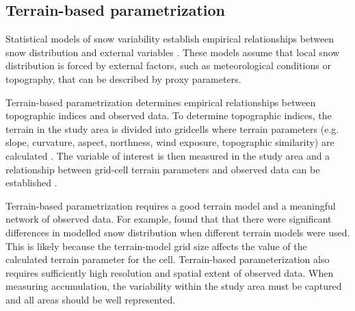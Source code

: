 \documentclass{sfuthesis}
\begin{document}
\subsection{Terrain-based parametrization}
Statistical models of snow variability establish empirical relationships between snow distribution and external variables \citep{Fowler2007}. These models assume that local snow distribution is forced by external factors, such as meteorological conditions or topography, that can be described by proxy parameters.

Terrain-based parametrization determines empirical relationships between topographic indices and observed data. To determine topographic indices, the terrain in the study area is divided into gridcells where terrain parameters (e.g. slope, curvature, aspect, northness, wind exposure, topographic similarity) are calculated \citep{Anderson2014,McGrath2015}. The variable of interest is then measured in the study area and a relationship between grid-cell terrain parameters and observed data can be established \citep[e.g.][]{Bloschl1991, Liston1998, Anderton2004,McGrath2015}. 

Terrain-based parametrization requires a good terrain model and a meaningful network of observed data. For example, \cite{Molotch2005} found that that there were significant differences in modelled snow distribution when different terrain models were used. This is likely because the terrain-model grid size affects the value of the calculated terrain parameter for the cell. Terrain-based parameterization also requires sufficiently high resolution and spatial extent of observed data. When measuring accumulation, the variability within the study area must be captured and all areas should be well represented. 
\end{document}

